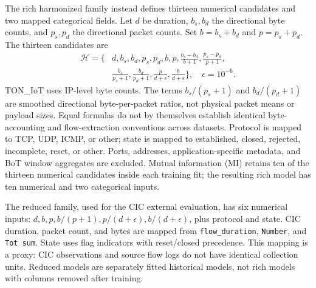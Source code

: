 \documentclass{ieeeaccess}
\begin{document}
The rich harmonized family instead defines thirteen numerical candidates and two mapped categorical fields. Let $d$ be duration, $b_s,b_d$ the directional byte counts, and $p_s,p_d$ the directional packet counts. Set $b=b_s+b_d$ and $p=p_s+p_d$. The thirteen candidates are
\begin{equation}
\begin{split}
\mathcal H=\bigg\{&d,b_s,b_d,p_s,p_d,b,p,\frac{b_s-b_d}{b+1},\frac{p_s-p_d}{p+1},\\[-2pt]
&\frac{b_s}{p_s+1},\frac{b_d}{p_d+1},\frac{p}{d+\epsilon},\frac{b}{d+\epsilon}\bigg\},
\quad \epsilon=10^{-6}.
\end{split}
\label{eq:harmonized}
\end{equation}
TON\_IoT uses IP-level byte counts. The terms $b_s/(p_s+1)$ and $b_d/(p_d+1)$ are smoothed directional byte-per-packet ratios, not physical packet means or payload sizes. Equal formulas do not by themselves establish identical byte-accounting and flow-extraction conventions across datasets. Protocol is mapped to TCP, UDP, ICMP, or other; state is mapped to established, closed, rejected, incomplete, reset, or other. Ports, addresses, application-specific metadata, and BoT window aggregates are excluded. Mutual information (MI) retains ten of the thirteen numerical candidates inside each training fit; the resulting rich model has ten numerical and two categorical inputs.

The reduced family, used for the CIC external evaluation, has six numerical inputs: $d,b,p,b/(p+1),p/(d+\epsilon),b/(d+\epsilon)$, plus protocol and state. CIC duration, packet count, and bytes are mapped from \texttt{flow\_duration}, \texttt{Number}, and \texttt{Tot sum}. State uses flag indicators with reset/closed precedence. This mapping is a proxy: CIC observations and source flow logs do not have identical collection units. Reduced models are separately fitted historical models, not rich models with columns removed after training.
\end{document}
